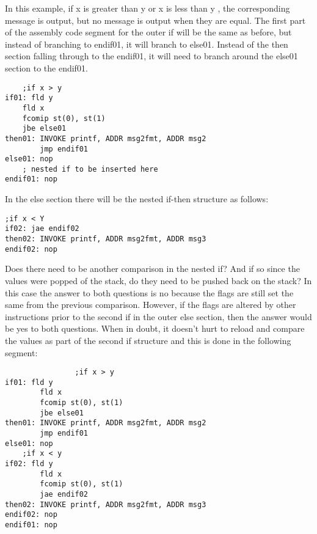 \documentclass[10pt]{article}
\begin{document}
In this example, if x is greater than y or x is less than y , the corresponding message is output, but no message is output when they are equal. The first part of the assembly code segment for the outer if will be the same as before, but instead of branching to endif01, it will branch to else01. Instead of the then section falling through to the endif01, it will need to branch around the else01 section to the endif01.

\begin{verbatim}
    ;if x > y
if01: fld y
    fld x
    fcomip st(0), st(1)
    jbe else01
then01: INVOKE printf, ADDR msg2fmt, ADDR msg2
        jmp endif01
else01: nop
    ; nested if to be inserted here
endif01: nop
\end{verbatim}

In the else section there will be the nested if-then structure as follows:

\begin{verbatim}
;if x < Y
if02: jae endif02
then02: INVOKE printf, ADDR msg2fmt, ADDR msg3
endif02: nop
\end{verbatim}

Does there need to be another comparison in the nested if? And if so since the values were popped of the stack, do they need to be pushed back on the stack? In this case the answer to both questions is no because the flags are still set the same from the previous comparison. However, if the flags are altered by other instructions prior to the second if in the outer else section, then the answer would be yes to both questions. When in doubt, it doesn't hurt to reload and compare the values as part of the second if structure and this is done in the following segment:

\begin{verbatim}
                ;if x > y
if01: fld y
        fld x
        fcomip st(0), st(1)
        jbe else01
then01: INVOKE printf, ADDR msg2fmt, ADDR msg2
        jmp endif01
else01: nop
    ;if x < y
if02: fld y
        fld x
        fcomip st(0), st(1)
        jae endif02
then02: INVOKE printf, ADDR msg2fmt, ADDR msg3
endif02: nop
endif01: nop
\end{verbatim}
\end{document}

